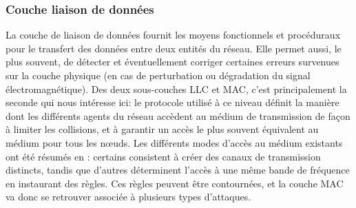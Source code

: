     \subsubsection{Couche liaison de données}
La couche de liaison de données fournit les moyens fonctionnels et procéduraux pour le transfert des données entre deux entités du réseau.
Elle permet aussi, le plus souvent, de détecter et éventuellement corriger certaines erreurs survenues sur la couche physique (en cas de perturbation ou dégradation du signal électromagnétique).
Des deux sous-couches LLC et MAC, c'est principalement la seconde qui nous intéresse ici: le protocole utilisé à ce niveau définit la manière dont les différents agents du réseau accèdent au médium de transmission de façon à limiter les collisions, et à garantir un accès le plus souvent équivalent au médium pour tous les nœuds.
Les différents modes d'accès au médium existants ont été résumés en : certains consistent à créer des canaux de transmission distincts, tandis que d'autres déterminent l'accès à une même bande de fréquence en instaurant des règles.
Ces règles peuvent être contournées, et la couche MAC va donc se retrouver associée à plusieurs types d'attaques.

